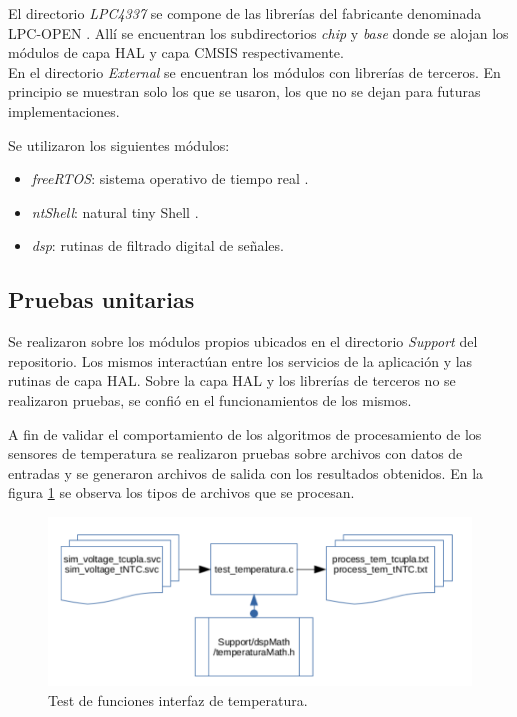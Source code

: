 El directorio \textit{LPC4337} se compone de las librerías del fabricante denominada LPC-OPEN \citep{lpcopen}. Allí se encuentran los subdirectorios \textit{chip} y \textit{base} donde se alojan los módulos de capa HAL \footnotemark y capa CMSIS \footnotemark respectivamente.\\

En el directorio \textit{External} se encuentran los módulos con librerías de terceros. En principio se muestran solo los que se usaron, los que no se dejan para futuras implementaciones. 

Se utilizaron los siguientes módulos:
\begin{itemize}
\item \textit{freeRTOS}: sistema operativo de tiempo real \citep{free_rtos}.
\item \textit{ntShell}: natural tiny Shell \citep{nt_shell}.
\item \textit{dsp}: rutinas de filtrado digital de señales.
\end{itemize}


\subsection{ Pruebas unitarias }

Se realizaron sobre los módulos propios ubicados en el directorio \textit{Support} del repositorio. Los mismos interactúan entre los servicios de la aplicación y las rutinas de capa HAL. Sobre la capa HAL y los librerías de terceros no se realizaron pruebas, se confió en el funcionamientos de los mismos.

A fin de validar el comportamiento de los algoritmos de procesamiento de los sensores de temperatura se realizaron pruebas sobre archivos con datos de entradas y se generaron archivos de salida con los resultados obtenidos. En la figura \ref{fig:diag_test_temp} se observa los tipos de archivos que se procesan.
\begin{figure}[h!]
	\centering
	\includegraphics[width=1.0\textwidth]{Figures/Cap_4/diag_test_temperatura}
	\caption{Test de funciones interfaz de temperatura.}
	\label{fig:diag_test_temp}
\end{figure}


